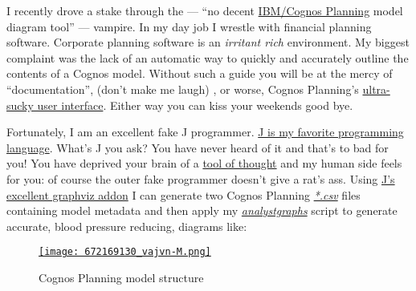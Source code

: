

I recently drove a stake through the --- ``no decent
\href{http://www-01.ibm.com/software/data/cognos/products/cognos-8-planning/}{IBM/Cognos
Planning} model diagram tool'' --- vampire. In my day job I wrestle with
financial planning software. Corporate planning software is an
\emph{irritant rich} environment. My biggest complaint was the lack of an
automatic way to quickly and accurately outline the contents of a Cognos
model. Without such a guide you will be at the mercy of
``documentation'', (don't make me laugh) , or worse, Cognos Planning's
\href{http://www.buigallery.com/}{ultra-sucky user interface}. Either
way you can kiss your weekends good bye.

Fortunately, I am an excellent fake J programmer.
\href{http://www.jsoftware.com/}{J is my favorite programming language}.
What's J you ask? You have never heard of it and that's to bad for you!
You have deprived your brain of a
\href{http://en.wikipedia.org/wiki/Kenneth\_E.\_Iverson}{tool of
thought} and my human side feels for you: of course the outer fake
programmer doesn't give a rat's ass. Using
\href{http://www.jsoftware.com/jwiki/Addons/graphics/graphviz}{J's
excellent graphviz addon} I can generate two Cognos Planning
\emph{\href{http://www.fileinfo.com/extension/csv}{*.csv}} files
containing model metadata and then apply my
\emph{\href{http://www.box.net/shared/7mqg9bek5x}{analystgraphs}} script
to generate accurate, blood pressure reducing, diagrams like:


\captionsetup[figure]{labelformat=empty}
\begin{figure}[htbp]
\centering
\href{http://conceptcontrol.smugmug.com/Other/utilimages/8074217\_BQjXN/1/\#672169130\_vajvn-A-LB}{\texttt{[image: 672169130\_vajvn-M.png]}}
\caption{Cognos Planning model structure}
\label{fig:1698X1}
\end{figure}


